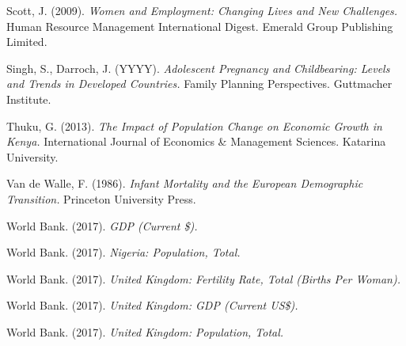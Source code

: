 \documentclass[11pt, english]{article}
\begin{document}
\begin{thebibliography}{9}
                Scott, J. (2009).           
                \textsl{Women and Employment: Changing Lives and New Challenges.}
     		Human Resource Management International Digest. Emerald Group Publishing Limited. 
	
                Singh, S., Darroch, J. (YYYY).
		\textsl{Adolescent Pregnancy and Childbearing: Levels and Trends in Developed Countries.}
		Family Planning Perspectives. Guttmacher Institute.
			
        	Thuku, G. (2013).
                \textsl{The Impact of Population Change on Economic Growth in Kenya.}                       International Journal of Economics \& Management Sciences. Katarina University.
	
                Van de Walle, F. (1986).
                \textsl{Infant Mortality and the European Demographic Transition.}
      		Princeton University Press.

                World Bank. (2017).
		\textsl{GDP (Current \$).}
			
                World Bank. (2017).           
                \textsl{Nigeria: Population, Total.}
	
                World Bank. (2017).                  
                \textsl{United Kingdom: Fertility Rate, Total (Births Per Woman).}
	
                World Bank. (2017).                  
                \textsl{United Kingdom: GDP (Current US\$).}
      
                World Bank. (2017).                  
                \textsl{United Kingdom: Population, Total.}

	\end{thebibliography}
\end{document}
